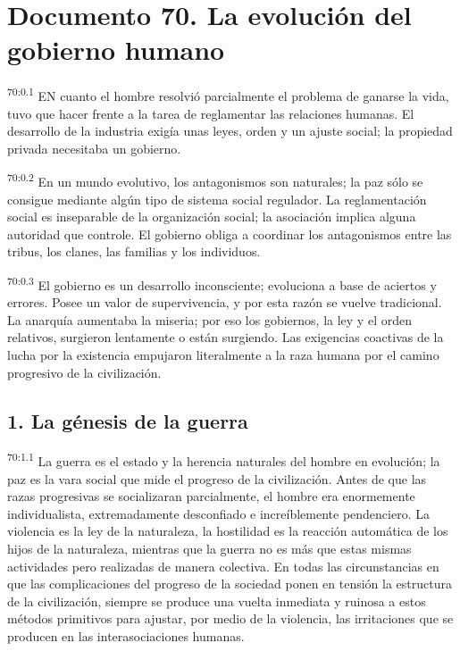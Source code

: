 \chapter{Documento 70. La evolución del gobierno humano}
\par
\textsuperscript{70:0.1} EN cuanto el hombre resolvió parcialmente el problema de ganarse la vida, tuvo que hacer frente a la tarea de reglamentar las relaciones humanas. El desarrollo de la industria exigía unas leyes, orden y un ajuste social; la propiedad privada necesitaba un gobierno.

\par
\textsuperscript{70:0.2} En un mundo evolutivo, los antagonismos son naturales; la paz sólo se consigue mediante algún tipo de sistema social regulador. La reglamentación social es inseparable de la organización social; la asociación implica alguna autoridad que controle. El gobierno obliga a coordinar los antagonismos entre las tribus, los clanes, las familias y los individuos.

\par
\textsuperscript{70:0.3} El gobierno es un desarrollo inconsciente; evoluciona a base de aciertos y errores. Posee un valor de supervivencia, y por esta razón se vuelve tradicional. La anarquía aumentaba la miseria; por eso los gobiernos, la ley y el orden relativos, surgieron lentamente o están surgiendo. Las exigencias coactivas de la lucha por la existencia empujaron literalmente a la raza humana por el camino progresivo de la civilización.

\section*{1. La génesis de la guerra}
\par
\textsuperscript{70:1.1} La guerra es el estado y la herencia naturales del hombre en evolución; la paz es la vara social que mide el progreso de la civilización. Antes de que las razas progresivas se socializaran parcialmente, el hombre era enormemente individualista, extremadamente desconfiado e increíblemente pendenciero. La violencia es la ley de la naturaleza, la hostilidad es la reacción automática de los hijos de la naturaleza, mientras que la guerra no es más que estas mismas actividades pero realizadas de manera colectiva. En todas las circunstancias en que las complicaciones del progreso de la sociedad ponen en tensión la estructura de la civilización, siempre se produce una vuelta inmediata y ruinosa a estos métodos primitivos para ajustar, por medio de la violencia, las irritaciones que se producen en las interasociaciones humanas.

